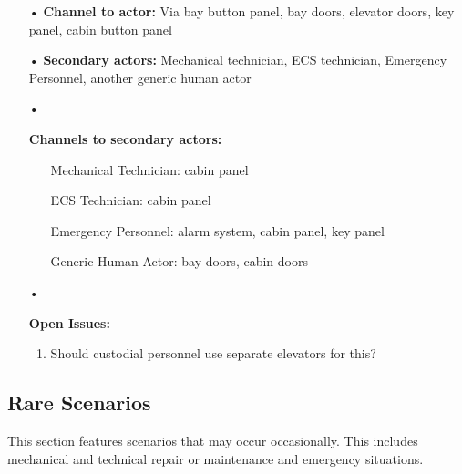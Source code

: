 \documentclass[12pt]{article}
\begin{document}
\begin{itemize}
			\item[•] \textbf{Channel to actor:} Via bay button panel, bay doors, elevator doors, key panel, cabin button panel 
			\item[•] \textbf{Secondary actors:} Mechanical technician, ECS technician, Emergency Personnel, another 
			generic human actor
			\item[•]{\textbf{Channels to secondary actors:}
			    \begin{itemize}
			    	\item[] Mechanical Technician: cabin panel
					\item[] ECS Technician: cabin panel
					\item[] Emergency Personnel: alarm system, cabin panel, key panel
					\item[] Generic Human Actor: bay doors, cabin doors
			    \end{itemize}}
			\item[•]{\textbf{Open Issues:}
				\begin{enumerate}
					\item Should custodial personnel use separate elevators for this?
				\end{enumerate}}
		\end{itemize}
	
	
	\subsection*{Rare Scenarios} This section features scenarios that may occur occasionally. This includes mechanical and technical
	repair or maintenance and emergency situations. 
	
\end{document}
